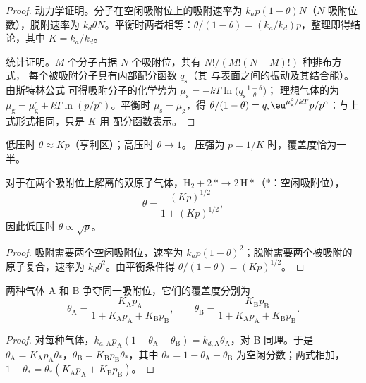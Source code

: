 \begin{proof}
动力学证明。分子在空闲吸附位上的吸附速率为 $k_ap(1 - \theta)N$（$N$
吸附位数），脱附速率为 $k_d\theta N$。平衡时两者相等：$\theta/(1 - \theta)
= (k_a/k_d)p$，整理即得结论，其中 $K = k_a/k_d$。

统计证明。$M$ 个分子占据 $N$ 个吸附位，共有 $N!/(M!(N - M)!)$ 种排布方式，
每个被吸附分子具有内部配分函数 $q_{\mathrm s}$（其
与表面之间的振动及其结合能）。由斯特林公式
可得吸附分子的化学势为 $\mu_{\mathrm s} = -kT\ln\bigl(q_{\mathrm s}\frac{1 - \theta}{\theta}\bigr)$；
理想气体的为 $\mu_{\mathrm g} = \mu_{\mathrm g}^\circ + kT\ln(p/p^\circ)$。平衡时 $\mu_{\mathrm s} = \mu_{\mathrm g}$，得
$\theta/(1 - \theta) = q_{\mathrm s}\eu^{\mu_{\mathrm g}^\circ/kT}p/p^\circ$：与上式形式相同，只是 $K$ 用
配分函数表示。
\end{proof}

低压时 $\theta \approx Kp$（亨利区）；高压时 $\theta \to 1$。
压强为 $p = 1/K$ 时，覆盖度恰为一半。

\begin{proposition}[解离吸附]\label{prop:b3:surfaces-catalysis:dissociative}
对于在两个吸附位上解离的双原子气体，$\mathrm{H_2} + 2\,{*} \to 2\,\mathrm{H}{*}$（${*}$：空闲吸附位），
\[
  \theta = \frac{(Kp)^{1/2}}{1 + (Kp)^{1/2}},
\]
因此低压时 $\theta \propto \sqrt p$。
\end{proposition}

\begin{proof}
吸附需要两个空闲吸附位，速率为 $k_ap(1 - \theta)^2$；脱附需要两个被吸附的
原子复合，速率为 $k_d\theta^2$。由平衡条件得 $\theta/(1 - \theta) =
(Kp)^{1/2}$。
\end{proof}

\begin{proposition}[竞争吸附]\label{prop:b3:surfaces-catalysis:competitive}
两种气体 A 和 B 争夺同一吸附位，它们的覆盖度分别为
\[
  \theta_{\mathrm A} = \frac{K_{\mathrm A}p_{\mathrm A}}{1 + K_{\mathrm A}p_{\mathrm A} + K_{\mathrm B}p_{\mathrm B}}, \qquad
  \theta_{\mathrm B} = \frac{K_{\mathrm B}p_{\mathrm B}}{1 + K_{\mathrm A}p_{\mathrm A} + K_{\mathrm B}p_{\mathrm B}} .
\]
\end{proposition}

\begin{proof}
对每种气体，$k_{a,\mathrm A}p_{\mathrm A}(1 - \theta_{\mathrm A} - \theta_{\mathrm B}) = k_{d,\mathrm A}\theta_{\mathrm A}$，对 B 同理。于是
$\theta_{\mathrm A} = K_{\mathrm A}p_{\mathrm A}\theta_\ast$，$\theta_{\mathrm B} = K_{\mathrm B}p_{\mathrm B}\theta_\ast$，其中 $\theta_\ast = 1 - \theta_{\mathrm A} - \theta_{\mathrm B}$ 为空闲分数；两式相加，
$1 - \theta_\ast = \theta_\ast(K_{\mathrm A}p_{\mathrm A} + K_{\mathrm B}p_{\mathrm B})$。
\end{proof}


